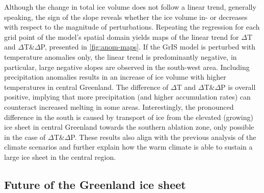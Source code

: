 Although the change in total ice volume does not follow a linear trend, generally speaking, the sign of the slope reveals whether the ice volume in- or decreases with respect to the magnitude of perturbations. Repeating the regression for each grid point of the model's spatial domain yields maps of the linear trend for \(\Delta\)T and \(\Delta\)T\&\(\Delta\)P, presented in \cref{fig:anom-maps}. If the GrIS model is perturbed with temperature anomalies only, the linear trend is predominantly negative, in particular, large negative slopes are observed in the south-west area. Including precipitation anomalies results in an increase of ice volume with higher temperatures in central Greenland. The difference of \(\Delta\)T and \(\Delta\)T\&\(\Delta\)P is overall positive, implying that more precipitation (and higher accumulation rates) can counteract increased melting in some areas. Interestingly, the pronounced difference in the south is caused by transport of ice from the elevated (growing) ice sheet in central Greenland towards the southern ablation zone, only possible in the case of \(\Delta\)T\&\(\Delta\)P. These results also align with the previous analysis of the climate scenarios and further explain how the warm climate is able to sustain a large ice sheet in the central region.

\subsection{Future of the Greenland ice sheet}


